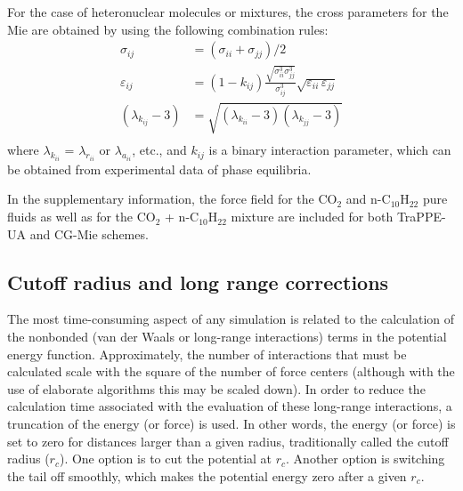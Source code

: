\documentclass[9pt,bestpractices]{livecoms}
\begin{document}
\begin{mdframed}[linewidth=0pt,backgroundcolor=LiveCoMSLightBlue!8,fontcolor=LiveCoMSDarkBlue!80!black]
For the case of heteronuclear molecules or mixtures, the cross parameters for the Mie are obtained by using the following combination rules:
\begin{align}
  \sigma_{ij} &= \left(\sigma_{ii}+\sigma_{jj}\right)/2 \\
  \varepsilon_{ij} &= \left(1-k_{ij}\right)\frac{\sqrt{\sigma_{ii}^{3}\sigma_{jj}^{3}}}{\sigma_{ij}^{3}}\sqrt{\varepsilon_{ii}\,\varepsilon_{jj}} \\
  \left(\lambda_{k_{ij}}-3\right) &= \sqrt{\left(\lambda_{k_{ii}}-3\right)\left(\lambda_{k_{jj}}-3\right)} \\
\end{align}
where $\lambda_{k_{ii}}$ = $\lambda_{r_{ii}}$ or $\lambda_{a_{ii}}$, etc., and $k_{ij}$ is a binary
interaction parameter, which can be obtained from experimental data of phase
equilibria.

In the supplementary information, the force field for the CO$_{2}$ and
n-C$_{10}$H$_{22}$ pure fluids as well as for the CO$_{2}$ + n-C$_{10}$H$_{22}$
mixture are included for both TraPPE-UA and CG-Mie schemes.
\end{mdframed}

\subsection{Cutoff radius and long range corrections} 
\label{sec:cutoff}
The most time-consuming aspect of any simulation is related to the calculation of the nonbonded (van
der Waals or long-range interactions) terms in the potential energy function.
Approximately, the number of interactions that must be calculated scale with
the square of the number of force centers (although with the use of elaborate
algorithms this may be scaled down). In order to reduce the calculation time
associated with the evaluation of these long-range interactions, a truncation
of the energy (or force) is used. In other words, the energy (or force) is set
to zero for distances larger than a given radius, traditionally called the
cutoff radius ($r_c$). One option is to cut the potential at $r_c$. Another 
option is switching the tail off smoothly, which makes the potential energy zero after
a given $r_c$. 
\end{document}
